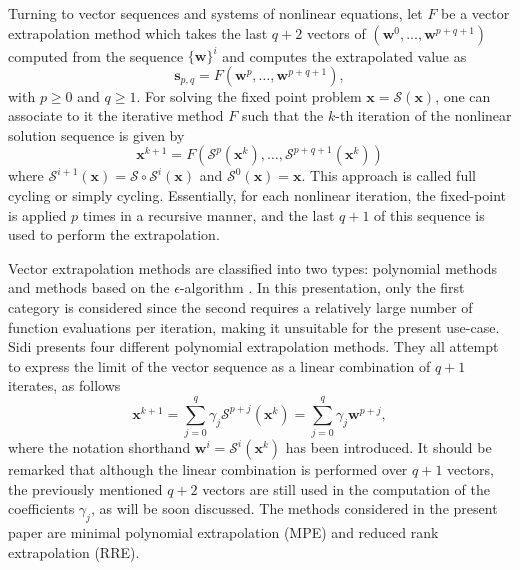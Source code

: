           Turning to vector sequences and systems of nonlinear equations, let \(F\) be a vector extrapolation method which takes the last $q+2$ vectors of $(\mathbf{w}^{0},...,\mathbf{w}^{p+q+1})$ computed from the sequence $\{\mathbf{w}\}^{i}$ and computes the extrapolated value as
          \begin{equation}
            \mathbf{s}_{p,q} = F\left(\mathbf{w}^{p}, \ldots, \mathbf{w}^{p+q+1}\right),
          \end{equation}
          with \(p\geq 0\) and \(q\geq 1\).
          For solving the fixed point problem \(\mathbf{x}=\bm{\mathcal{S}}(\mathbf{x})\), one can associate to it the iterative method \(F\) such that the $k$-th iteration of the nonlinear solution sequence is given by
          \begin{equation}
            \mathbf{x}^{k+1}=F\left(\bm{\mathcal{S}}^{p}(\mathbf{x}^{k}), \ldots, \bm{\mathcal{S}}^{p+q+1}(\mathbf{x}^{k})\right)
          \end{equation}
          where \(\bm{\mathcal{S}}^{i+1}(\mathbf{x})=\bm{\mathcal{S}} \circ \bm{\mathcal{S}}^{i}(\mathbf{x})\) and \(\bm{\mathcal{S}}^{0}(\mathbf{x})=\mathbf{x}\).
          This approach is called full cycling or simply cycling.
          Essentially, for each nonlinear iteration, the fixed-point is applied  $p$ times in a recursive manner, and the last $q+1$ of this sequence is used to perform the extrapolation.

          Vector extrapolation methods are classified into two types: polynomial methods and methods based on the \(\epsilon\)-algorithm \citep{brezinski_extrapolation_2013, sidi_vector_2017}.
          In this presentation, only the first category is considered since the second requires a relatively large number of function evaluations per iteration, making it unsuitable for the present use-case.
          Sidi \citep{sidi_vector_2017} presents four different polynomial extrapolation methods.
          They all attempt to express the limit of the vector sequence as a linear combination of \(q+1\) iterates, as follows
          \begin{equation}
            \mathbf{x}^{k+1} = \sum_{j=0}^{q} \gamma_{j} \bm{\mathcal{S}}^{p+j}(\mathbf{x}^{k})  = \sum_{j=0}^{q} \gamma_{j} \mathbf{w}^{p+j},
          \end{equation}
          where the notation shorthand $\mathbf{w}^{i} = \bm{\mathcal{S}}^{i}(\mathbf{x}^{k})$ has been introduced.
          It should be remarked that although the linear combination is performed over $q+1$ vectors, the previously mentioned $q+2$ vectors are still used in the computation of the coefficients $\gamma_{j}$, as will be soon discussed.
          The methods considered in the present paper are minimal polynomial extrapolation (MPE) and reduced rank extrapolation (RRE).

